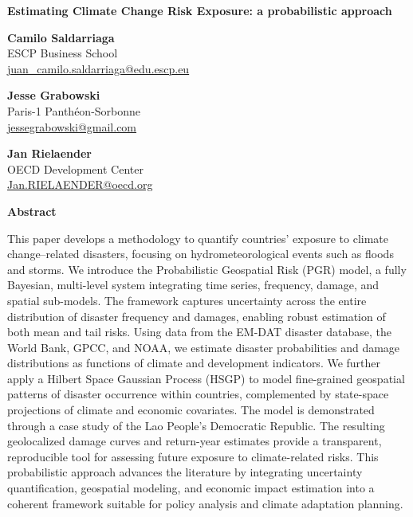 
\begin{titlepage}
\raggedright

{\fontsize{36pt}{40pt}\selectfont\bfseries\color{OECDblue}
Estimating Climate Change Risk Exposure: a probabilistic approach\par}

\vspace{2cm}

\raggedleft
\setlength{\parskip}{0.3em}

\textbf{Camilo Saldarriaga}\\
ESCP Business School\\
\href{mailto:juan_camilo.saldarriaga@edu.escp.eu}{juan_camilo.saldarriaga@edu.escp.eu}

\vspace{1.5em}

\textbf{Jesse Grabowski}\\
Paris-1 Panth\'{e}on-Sorbonne\\
\href{mailto:jessegrabowski@gmail.com}{jessegrabowski@gmail.com}

\vspace{1.5em}

\textbf{Jan Rielaender}\\
OECD Development Center\\
\href{mailto:Jan.RIELAENDER@oecd.org}{Jan.RIELAENDER@oecd.org}

\vspace{2cm}

\raggedright
\textbf{Abstract}

\justifying
This paper develops a methodology to quantify countries' exposure to climate change--related disasters, focusing on hydrometeorological events such as floods and storms. We introduce the Probabilistic Geospatial Risk (PGR) model, a fully Bayesian, multi-level system integrating time series, frequency, damage, and spatial sub-models. The framework captures uncertainty across the entire distribution of disaster frequency and damages, enabling robust estimation of both mean and tail risks. Using data from the EM-DAT disaster database, the World Bank, GPCC, and NOAA, we estimate disaster probabilities and damage distributions as functions of climate and development indicators. We further apply a Hilbert Space Gaussian Process (HSGP) to model fine-grained geospatial patterns of disaster occurrence within countries, complemented by state-space projections of climate and economic covariates. The model is demonstrated through a case study of the Lao People's Democratic Republic. The resulting geolocalized damage curves and return-year estimates provide a transparent, reproducible tool for assessing future exposure to climate-related risks. This probabilistic approach advances the literature by integrating uncertainty quantification, geospatial modeling, and economic impact estimation into a coherent framework suitable for policy analysis and climate adaptation planning.


\end{titlepage}
